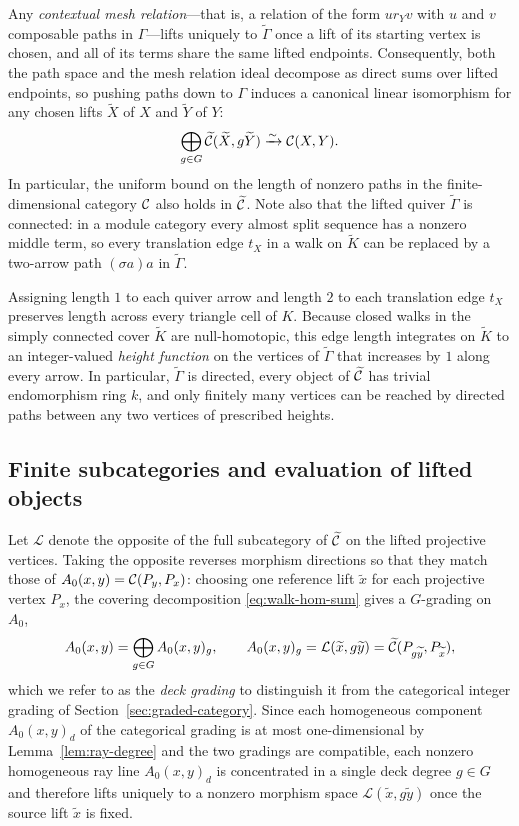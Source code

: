 Any \emph{contextual mesh relation}—that is, a relation of the form
$u r_Y v$ with $u$ and $v$ composable paths in $\Gamma$—lifts uniquely to
$\widetilde\Gamma$ once a lift of its starting vertex is chosen, and all of
its terms share the same lifted endpoints. Consequently, both the path space
and the mesh relation ideal decompose as direct sums over lifted endpoints,
so pushing paths down to $\Gamma$ induces a canonical linear isomorphism for
any chosen lifts $\widetilde X$ of $X$ and $\widetilde Y$ of $Y$:
\begin{equation}
 \bigoplus_{g\in G}\widetilde{\mathcal C}(\widetilde X,g\widetilde Y)
                 \xrightarrow{\sim}\mathcal C(X,Y).
 \label{eq:walk-hom-sum}
\end{equation}
In particular, the uniform bound on the length of nonzero paths in the
finite-dimensional category $\mathcal C$ also holds in $\widetilde{\mathcal C}$. Note also
that the lifted quiver $\widetilde\Gamma$ is connected: in a module category
every almost split sequence has a nonzero middle term, so every translation
edge $t_X$ in a walk on $\widetilde K$ can be replaced by a two-arrow path
$(\sigma a)a$ in $\widetilde\Gamma$.

Assigning length $1$ to each quiver arrow and length $2$ to each translation
edge $t_X$ preserves length across every triangle cell of $K$. Because closed
walks in the simply connected cover $\widetilde K$ are null-homotopic, this
edge length integrates on $\widetilde K$ to an integer-valued \emph{height
function} on the vertices of $\widetilde\Gamma$ that increases by $1$ along
every arrow. In particular, $\widetilde\Gamma$ is directed, every object of
$\widetilde{\mathcal C}$ has trivial endomorphism ring $k$, and only finitely many
vertices can be reached by directed paths between any two vertices of
prescribed heights.

\subsection{Finite subcategories and evaluation of lifted objects}
\label{subsec:lifted-projectives}

Let $\mathcal L$ denote the opposite of the full subcategory of
$\widetilde{\mathcal C}$ on the lifted projective vertices. Taking the opposite
reverses morphism directions so that they match those of
$A_0(x,y)=\mathcal C(P_y,P_x)$: choosing one reference lift $\widetilde x$ for each
projective vertex $P_x$, the covering decomposition \eqref{eq:walk-hom-sum}
gives a $G$-grading on $A_0$,
\[
 A_0(x,y)=\bigoplus_{g\in G}A_0(x,y)_g,\qquad
 A_0(x,y)_g=\mathcal L(\widetilde x,g\widetilde y)=\widetilde{\mathcal C}(P_{g\widetilde y},P_{\widetilde x}),
\]
which we refer to as the \emph{deck grading} to distinguish it from the
categorical integer grading of Section~\ref{sec:graded-category}. Since each
homogeneous component $A_0(x,y)_d$ of the categorical grading is at most
one-dimensional by Lemma~\ref{lem:ray-degree} and the two gradings are
compatible, each nonzero homogeneous ray line $A_0(x,y)_d$ is concentrated in
a single deck degree $g\in G$ and therefore lifts uniquely to a nonzero
morphism space $\mathcal L(\widetilde x,g\widetilde y)$ once the source lift
$\widetilde x$ is fixed.

